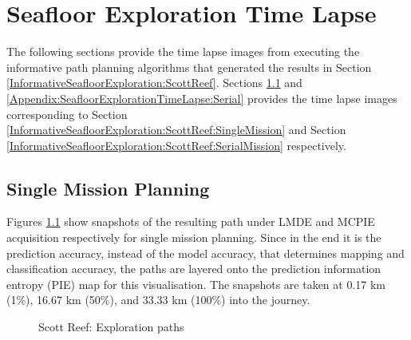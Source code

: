 \chapter{Seafloor Exploration Time Lapse}
\label{Appendix:SeafloorExplorationTimeLapse}

	The following sections provide the time lapse images from executing the informative path planning algorithms that generated the results in Section \ref{InformativeSeafloorExploration:ScottReef}. Sections \ref{Appendix:SeafloorExplorationTimeLapse:Single} and \ref{Appendix:SeafloorExplorationTimeLapse:Serial} provides the time lapse images corresponding to Section \ref{InformativeSeafloorExploration:ScottReef:SingleMission} and Section \ref{InformativeSeafloorExploration:ScottReef:SerialMission} respectively.
	
	\section{Single Mission Planning}
	\label{Appendix:SeafloorExplorationTimeLapse:Single}

			Figures \ref{Figure:OptimalPaths} show snapshots of the resulting path under LMDE and MCPIE acquisition respectively for single mission planning. Since in the end it is the prediction accuracy, instead of the model accuracy, that determines mapping and classification accuracy, the paths are layered onto the prediction information entropy (PIE) map for this visualisation. The snapshots are taken at 0.17 km (1\%), 16.67 km (50\%), and 33.33 km (100\%) into the journey.
				
			\begin{figure}[!htbp]
			\centering
			\caption{Scott Reef: Exploration paths}
			\label{Figure:OptimalPaths}
			\end{figure}
			
